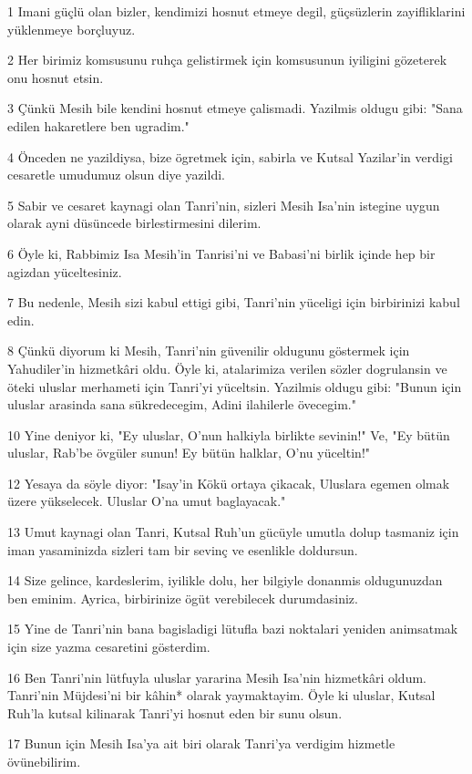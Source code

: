 \par 1 Imani güçlü olan bizler, kendimizi hosnut etmeye degil, güçsüzlerin zayifliklarini yüklenmeye borçluyuz.
\par 2 Her birimiz komsusunu ruhça gelistirmek için komsusunun iyiligini gözeterek onu hosnut etsin.
\par 3 Çünkü Mesih bile kendini hosnut etmeye çalismadi. Yazilmis oldugu gibi: "Sana edilen hakaretlere ben ugradim."
\par 4 Önceden ne yazildiysa, bize ögretmek için, sabirla ve Kutsal Yazilar'in verdigi cesaretle umudumuz olsun diye yazildi.
\par 5 Sabir ve cesaret kaynagi olan Tanri'nin, sizleri Mesih Isa'nin istegine uygun olarak ayni düsüncede birlestirmesini dilerim.
\par 6 Öyle ki, Rabbimiz Isa Mesih'in Tanrisi'ni ve Babasi'ni birlik içinde hep bir agizdan yüceltesiniz.
\par 7 Bu nedenle, Mesih sizi kabul ettigi gibi, Tanri'nin yüceligi için birbirinizi kabul edin.
\par 8 Çünkü diyorum ki Mesih, Tanri'nin güvenilir oldugunu göstermek için Yahudiler'in hizmetkâri oldu. Öyle ki, atalarimiza verilen sözler dogrulansin ve öteki uluslar merhameti için Tanri'yi yüceltsin. Yazilmis oldugu gibi: "Bunun için uluslar arasinda sana sükredecegim, Adini ilahilerle övecegim."
\par 10 Yine deniyor ki, "Ey uluslar, O'nun halkiyla birlikte sevinin!" Ve, "Ey bütün uluslar, Rab'be övgüler sunun! Ey bütün halklar, O'nu yüceltin!"
\par 12 Yesaya da söyle diyor: "Isay'in Kökü ortaya çikacak, Uluslara egemen olmak üzere yükselecek. Uluslar O'na umut baglayacak."
\par 13 Umut kaynagi olan Tanri, Kutsal Ruh'un gücüyle umutla dolup tasmaniz için iman yasaminizda sizleri tam bir sevinç ve esenlikle doldursun.
\par 14 Size gelince, kardeslerim, iyilikle dolu, her bilgiyle donanmis oldugunuzdan ben eminim. Ayrica, birbirinize ögüt verebilecek durumdasiniz.
\par 15 Yine de Tanri'nin bana bagisladigi lütufla bazi noktalari yeniden animsatmak için size yazma cesaretini gösterdim.
\par 16 Ben Tanri'nin lütfuyla uluslar yararina Mesih Isa'nin hizmetkâri oldum. Tanri'nin Müjdesi'ni bir kâhin* olarak yaymaktayim. Öyle ki uluslar, Kutsal Ruh'la kutsal kilinarak Tanri'yi hosnut eden bir sunu olsun.
\par 17 Bunun için Mesih Isa'ya ait biri olarak Tanri'ya verdigim hizmetle övünebilirim.
